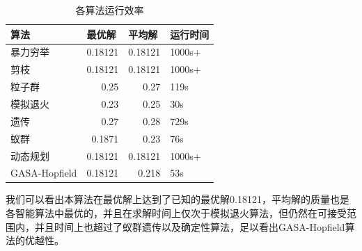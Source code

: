 \begin{table}[H]
    \centering
    \caption{各算法运行效率}
      \begin{tabular}{|l|r|r|l|}
        \hline 
      算法    & \multicolumn{1}{l|}{最优解} & \multicolumn{1}{l|}{平均解} & 运行时间 \\
      \hline 
      暴力穷举  & 0.18121 & 0.18121 & 1000s+ \\

      剪枝    & 0.18121 & 0.18121 & 1000s+ \\

      粒子群   & 0.25  & 0.27  & 119s \\

      模拟退火  & 0.23  & 0.25  & 30s \\

      遗传    & 0.27  & 0.28  & 729s \\

      蚁群    & 0.1871 & 0.23  & 76s \\

      动态规划  & 0.18121 & 0.18121 & 1000s+ \\

      GASA-Hopfield & 0.18121 & 0.218 & 53s \\
      \hline 
      \end{tabular}%
    \label{tab:gsfyxxl}%
  \end{table}%
  我们可以看出本算法在最优解上达到了已知的最优解0.18121，平均解的质量也是各智能算法中最优的，并且在求解时间上仅次于模拟退火算法，但仍然在可接受范围内，并且时间上也超过了蚁群遗传以及确定性算法，足以看出GASA-Hopfield算法的优越性。